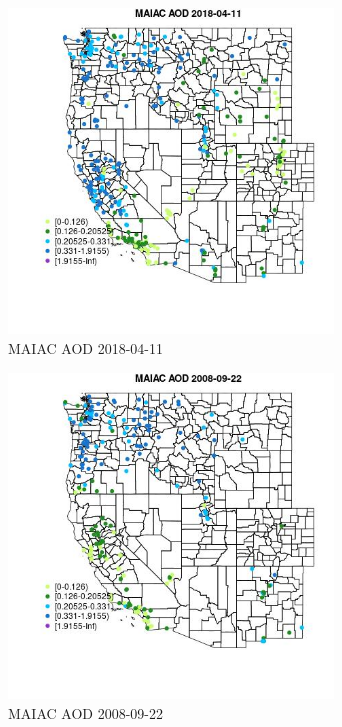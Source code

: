 \begin{figure} 
\centering  
\includegraphics[width=0.77\textwidth]{Code_Outputs/Report_ML_input_PM25_Step4_part_e_de_duplicated_aves_compiled_2019-05-18wNAs_MapObsMAIAC_AOD2018-04-11.jpg} 
\caption{\label{fig:Report_ML_input_PM25_Step4_part_e_de_duplicated_aves_compiled_2019-05-18wNAsMapObsMAIAC_AOD2018-04-11}MAIAC AOD 2018-04-11} 
\end{figure} 
 

\begin{figure} 
\centering  
\includegraphics[width=0.77\textwidth]{Code_Outputs/Report_ML_input_PM25_Step4_part_e_de_duplicated_aves_compiled_2019-05-18wNAs_MapObsMAIAC_AOD2008-09-22.jpg} 
\caption{\label{fig:Report_ML_input_PM25_Step4_part_e_de_duplicated_aves_compiled_2019-05-18wNAsMapObsMAIAC_AOD2008-09-22}MAIAC AOD 2008-09-22} 
\end{figure} 
 

